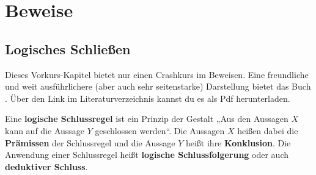 


    
\chapter{Beweise} \label{chap:beweise}


\section{Logisches Schließen}


\begin{bem}[Buchtipp]
    Dieses Vorkurs-Kapitel bietet nur einen Crashkurs im Beweisen. Eine freundliche und weit ausführlichere (aber auch sehr seitenstarke) Darstellung bietet das Buch \cite{Vel06}. Über den Link im Literaturverzeichnis kannst du es als Pdf herunterladen.
\end{bem}


\begin{defin}  \label{schlussregel}
    Eine \textbf{logische Schlussregel} ist ein Prinzip der Gestalt „Aus den Aussagen $X$ kann auf die Aussage $Y$ geschlossen werden“. Die Aussagen $X$ heißen dabei die \textbf{Prämissen} der Schlussregel und die Aussage $Y$ heißt ihre \textbf{Konklusion}. Die Anwendung einer Schlussregel heißt \textbf{logische Schlussfolgerung} oder auch \textbf{deduktiver Schluss}.
\end{defin}


